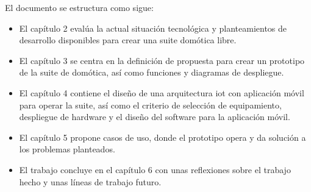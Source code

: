 El documento se estructura como sigue:

\begin{itemize}
  \item El capítulo 2 evalúa la actual situación tecnológica y planteamientos de desarrollo disponibles para crear una suite domótica libre.

  \item El capítulo 3 se centra en la definición de propuesta para crear un prototipo de la suite de domótica, así como funciones y diagramas de despliegue.

  \item El capítulo 4 contiene el diseño de una arquitectura \gls{iot} con aplicación móvil para operar la suite, así como el criterio de selección de equipamiento, despliegue de hardware y el diseño del software para la aplicación móvil.

  \item El capítulo 5 propone casos de uso, donde el prototipo opera y da solución a los problemas planteados.

  \item El trabajo concluye en el capítulo 6 con unas reflexiones sobre el trabajo hecho y unas líneas de trabajo futuro.

\end{itemize}
